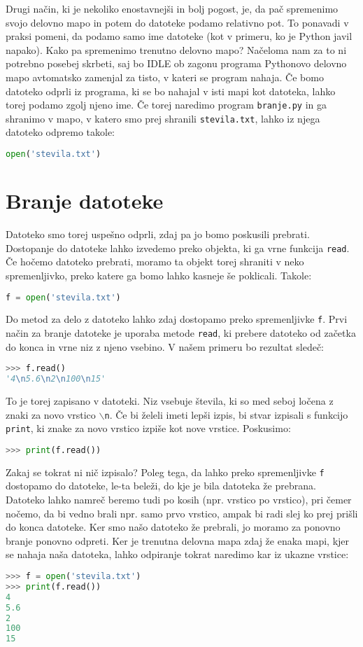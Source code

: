 Drugi način, ki je nekoliko enostavnejši in bolj pogost, je, da pač spremenimo svojo delovno mapo in potem do datoteke podamo relativno pot. To ponavadi v praksi pomeni, da podamo samo ime datoteke (kot v primeru, ko je Python javil napako). Kako pa spremenimo trenutno delovno mapo? Načeloma nam za to ni potrebno posebej skrbeti, saj bo IDLE ob zagonu programa Pythonovo delovno mapo avtomatsko zamenjal za tisto, v kateri se program nahaja. Če bomo datoteko odprli iz programa, ki se bo nahajal v isti mapi kot datoteka, lahko torej podamo zgolj njeno ime. Če torej naredimo program \texttt{branje.py} in ga shranimo v mapo, v katero smo prej shranili \texttt{stevila.txt}, lahko iz njega datoteko odpremo takole:
\begin{lstlisting}[language=Python, showstringspaces=false]
open('stevila.txt')
\end{lstlisting}

\section{Branje datoteke}
Datoteko smo torej uspešno odprli, zdaj pa jo bomo poskusili prebrati. Dostopanje do datoteke lahko izvedemo preko objekta, ki ga vrne funkcija \texttt{read}. Če hočemo datoteko prebrati, moramo ta objekt torej shraniti v neko spremenljivko, preko katere ga bomo lahko kasneje še poklicali. Takole:
\begin{lstlisting}[language=Python, showstringspaces=false]
f = open('stevila.txt')
\end{lstlisting}
Do metod za delo z datoteko lahko zdaj dostopamo preko spremenljivke \texttt{f}. Prvi način za branje datoteke je uporaba metode \texttt{read}, ki prebere datoteko od začetka do konca in vrne niz z njeno vsebino. V našem primeru bo rezultat sledeč:
\begin{lstlisting}[language=Python, showstringspaces=false]
>>> f.read()
'4\n5.6\n2\n100\n15'
\end{lstlisting}
To je torej zapisano v datoteki. Niz vsebuje števila, ki so med seboj ločena z znaki za novo vrstico \texttt{$\backslash$n}. Če bi želeli imeti lepši izpis, bi stvar izpisali s funkcijo \texttt{print}, ki znake za novo vrstico izpiše kot nove vrstice. Poskusimo:
\begin{lstlisting}[language=Python, showstringspaces=false]
>>> print(f.read())

\end{lstlisting}
Zakaj se tokrat ni nič izpisalo? Poleg tega, da lahko preko spremenljivke \texttt{f} dostopamo do datoteke, le-ta beleži, do kje je bila datoteka že prebrana. Datoteko lahko namreč beremo tudi po kosih (npr. vrstico po vrstico), pri čemer nočemo, da bi vedno brali npr. samo prvo vrstico, ampak bi radi slej ko prej prišli do konca datoteke. Ker smo našo datoteko že prebrali, jo moramo za ponovno branje ponovno odpreti. Ker je trenutna delovna mapa zdaj že enaka mapi, kjer se nahaja naša datoteka, lahko odpiranje tokrat naredimo kar iz ukazne vrstice:
\begin{lstlisting}[language=Python, showstringspaces=false]
>>> f = open('stevila.txt')
>>> print(f.read())
4
5.6
2
100
15
\end{lstlisting}

